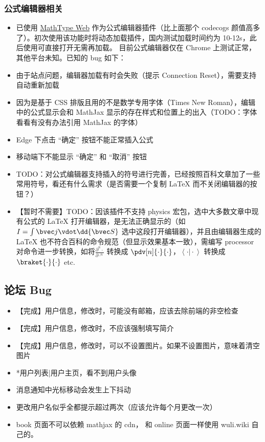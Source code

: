 \subsubsection{公式编辑器相关}
\begin{itemize}
\item 已使用 \href{http://www.wiris.net/client/editor/resources/help.html?v=7.9.0.6564}{MathType Web} 作为公式编辑器插件（比上面那个 codecogs 颜值高多了）。初次使用该功能时将动态加载插件，国内测试加载时间约为 10-12s，此后使用可直接打开无需再加载。
目前公式编辑器仅在 Chrome 上测试正常，其他平台未知。已知的 bug 如下：

\item 由于站点问题，编辑器加载有时会失败（提示 Connection Reset），需要支持自动重新加载

\item 因为是基于 CSS 排版且用的不是数学专用字体（Times New Roman），编辑中的公式显示会和 MathJax 显示的存在样式和位置上的出入（TODO：字体看看有没有办法引用 MathJax 的字体）

\item Edge 下点击 “确定” 按钮不能正常插入公式

\item 移动端下不能显示 “确定” 和 “取消” 按钮

\item TODO：对公式编辑器支持插入的符号进行完善，已经按照百科文章加了一些常用符号，看还有什么需求（是否需要一个复制 LaTeX 而不关闭编辑器的按钮？）

\item 【暂时不需要】TODO：因该插件不支持 physics 宏包，选中大多数文章中现有公式的 LaTeX 打开编辑器，是无法正确显示的（如 $I = \int\bvec j \vdot \dd{\bvec S}$ 选中这段打开编辑器），并且由编辑器生成的 LaTeX 也不符合百科的命令规范（但显示效果基本一致），需编写 processor 对命令进一步转换，如将$\frac{\partial^{n}{\cdot}}{\partial{\cdot}^{n}}$ 转换成 $\pdv[n]{\cdot}{\cdot}$，$\left\langle{\cdot}\vert{\cdot}\right\rangle$ 转换成 $\braket{\cdot}{\cdot}$ etc.
\end{itemize}

\subsection{论坛 Bug}\label{sub_edTODO_3}
\begin{itemize}
\item 【完成】用户信息，修改时，可能没有邮箱，应该去除前端的非空检查
\item 【完成】用户信息，修改时，不应该强制填写简介
\item 【完成】用户信息，修改时，可以不设置图片。如果不设置图片，意味着清空图片
\item *用户列表|用户主页，看不到用户头像
\item 消息通知中光标移动会发生上下抖动
\item 更改用户名似乎全都提示超过两次（应该允许每个月更改一次）
\item book 页面不可以依赖 mathjax 的 cdn， 和 online 页面一样使用 wuli.wiki 自己的。
\end{itemize}

